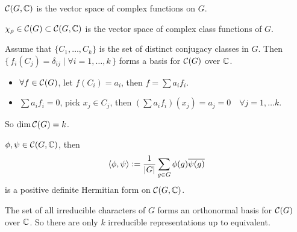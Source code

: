 \begin{definition}
  $\mathcal{C}(G, \mathbb{C})$ is the vector space of complex functions on $G$.

  $\chi_\rho \in \mathcal{C}(G) \subset \mathcal{C}(G, \mathbb{C})$
  is the vector space of complex class functions of $G$.
\end{definition}


\begin{remark}
  Assume that $\{ C_1, \dots, C_k \}$ is the set of distinct conjugacy classes
  in $G$.
  Then $\{\, f_i(C_j) = \delta_{ij} \mid \forall i = 1, \dots, k \,\}$ forms
  a basis for $\mathcal{C}(G)$ over $\mathbb{C}$.
  \begin{itemize}
    \item $\forall f \in \mathcal{C}(G)$, let $f(C_i) = a_i$, then
      $f = \sum a_i f_i$.
    \item $\sum a_i f_i = 0$, pick $x_j \in C_j$, then
      $(\sum a_if_i)(x_j) = a_j = 0 \quad \forall j = 1, \dots k$.
  \end{itemize}
  So $\dim \mathcal{C}(G) = k$.
\end{remark}

\begin{definition}
  $\phi, \psi \in \mathcal{C}(G, \mathbb{C})$, then
  \[ \langle\phi, \psi\rangle \vcentcolon= \frac{1}{\lvert G\rvert} \sum_{g\in G} \phi(g) \overline{\psi(g)} \]
  is a positive definite Hermitian form on $\mathcal{C}(G, \mathbb{C})$.
\end{definition}

\begin{theorem}
  The set of all irreducible characters of $G$ forms an orthonormal basis for $\mathcal{C}(G)$
  over $\mathbb{C}$. So there are only $k$ irreducible representations up to equivalent.
\end{theorem}

